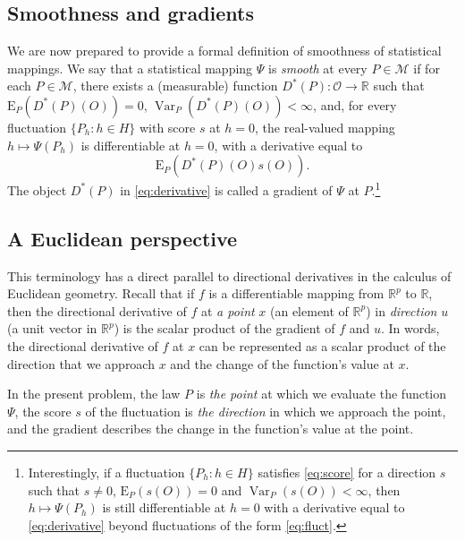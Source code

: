 \documentclass[
  11pt,
  openright,twoside]{book}
\DeclareMathOperator{\Var}{Var}
\newcommand{\bbR}{\mathbb{R}}
\newcommand{\calM}{\mathcal{M}}
\newcommand{\calO}{\mathcal{O}}
\newcommand{\Exp}{\textrm{E}}
\theoremstyle{definition}
\theoremstyle{definition}
\theoremstyle{definition}
\theoremstyle{definition}
\theoremstyle{remark}
\begin{document}
\hypertarget{smoothness-and-gradients}{%
\subsection{Smoothness and gradients}\label{smoothness-and-gradients}}

We are now prepared to provide a formal definition of smoothness of
statistical mappings. We say that a statistical mapping \(\Psi\) is \emph{smooth} at
every \(P \in \calM\) if for each \(P \in \calM\), there exists a (measurable)
function \(D^{*}(P) : \calO \to \bbR\) such that \(\Exp_{P}(D^{*}(P)(O)) = 0\),
\(\Var_{P}(D^{*}(P)(O)) < \infty\), and, for every fluctuation \(\{P_{h} : h \in H\}\) with score \(s\) at \(h = 0\), the real-valued mapping \(h \mapsto \Psi(P_{h})\) is differentiable at \(h=0\), with a derivative equal to
\begin{equation} 
\Exp_{P} \left( D^{*}(P)(O) s(O) \right).  \label{eq:derivative} 
\end{equation}
The object \(D^*(P)\) in \eqref{eq:derivative} is called a
gradient of \(\Psi\) at \(P\).\footnote{Interestingly, if a fluctuation \(\{P_{h} : h \in H\}\) satisfies \eqref{eq:score} for a direction \(s\) such that \(s\neq 0\),
  \(\Exp_{P}(s(O)) = 0\) and \(\Var_{P} (s(O)) < \infty\), then \(h \mapsto \Psi(P_{h})\) is still differentiable at \(h=0\) with a derivative equal to
  \eqref{eq:derivative} beyond fluctuations of the form \eqref{eq:fluct}.}

\hypertarget{Euclidean-perspective}{%
\subsection{A Euclidean perspective}\label{Euclidean-perspective}}

This terminology has a direct parallel to directional derivatives in the
calculus of Euclidean geometry. Recall that if \(f\) is a differentiable
mapping from \(\bbR^p\) to \(\bbR\), then the directional derivative of \(f\) at \emph{a
point} \(x\) (an element of \(\bbR^p\)) in \emph{direction} \(u\) (a unit vector in
\(\bbR^p\)) is the scalar product of the gradient of \(f\) and \(u\). In words, the
directional derivative of \(f\) at \(x\) can be represented as a scalar product of
the direction that we approach \(x\) and the change of the function's value at
\(x\).

In the present problem, the law \(P\) is \emph{the point} at which we evaluate the
function \(\Psi\), the score \(s\) of the fluctuation is \emph{the direction} in which
we approach the point, and the gradient describes the change in the function's
value at the point.
\end{document}
